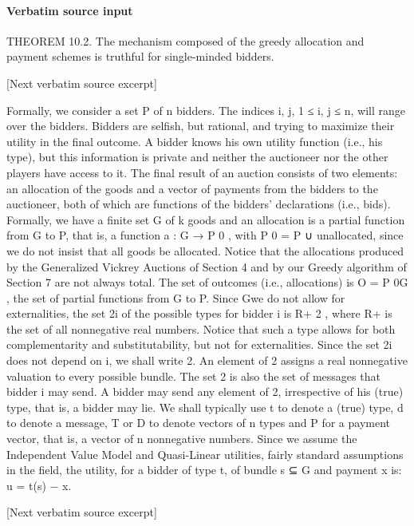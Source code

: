 \documentclass[10pt]{article}
\begin{document}
\paragraph{Verbatim source input}
\begin{ReviewVerbatim}
THEOREM 10.2. The mechanism composed of the greedy allocation and payment schemes is truthful for single-minded bidders.

[Next verbatim source excerpt]

Formally, we consider a set P of n bidders. The indices i, j, 1 ≤ i, j ≤ n, will
range over the bidders. Bidders are selfish, but rational, and trying to maximize their
utility in the final outcome. A bidder knows his own utility function (i.e., his type),
but this information is private and neither the auctioneer nor the other players have
access to it. The final result of an auction consists of two elements: an allocation
of the goods and a vector of payments from the bidders to the auctioneer, both of
which are functions of the bidders’ declarations (i.e., bids). Formally, we have a
finite set G of k goods and an allocation is a partial function from G to P, that is, a
function a : G → P 0 , with P 0 = P ∪ {unallocated}, since we do not insist that all
goods be allocated. Notice that the allocations produced by the Generalized Vickrey
Auctions of Section 4 and by our Greedy algorithm of Section 7 are not always
total. The set of outcomes (i.e., allocations) is O = P 0G , the set of partial functions
from G to P. Since Gwe do not allow for externalities, the set 2i of the possible types
for bidder i is R+ 2 , where R+ is the set of all nonnegative real numbers. Notice
that such a type allows for both complementarity and substitutability, but not for
externalities. Since the set 2i does not depend on i, we shall write 2. An element
of 2 assigns a real nonnegative valuation to every possible bundle. The set 2 is
also the set of messages that bidder i may send. A bidder may send any element of
2, irrespective of his (true) type, that is, a bidder may lie. We shall typically use t
to denote a (true) type, d to denote a message, T or D to denote vectors of n types
and P for a payment vector, that is, a vector of n nonnegative numbers.
Since we assume the Independent Value Model and Quasi-Linear utilities, fairly
standard assumptions in the field, the utility, for a bidder of type t, of bundle s ⊆ G
and payment x is:
u = t(s) − x.

[Next verbatim source excerpt]


\end{ReviewVerbatim}
\end{document}
